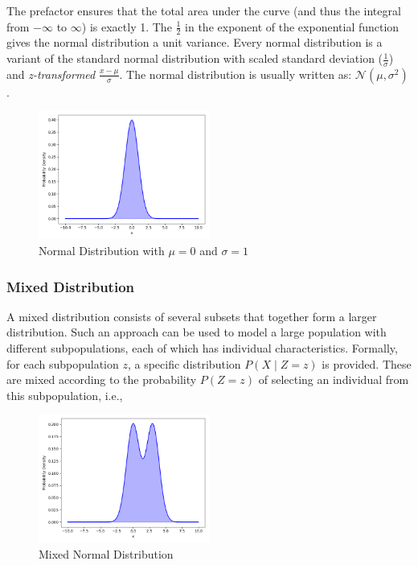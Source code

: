 The prefactor ensures that the total area under the curve (and thus the integral from $-\infty$ to $\infty$) is exactly 1. The $\frac{1}{2}$ in the exponent of the exponential function gives the normal distribution a unit variance. Every normal distribution is a variant of the standard normal distribution with scaled standard deviation ($\frac{1}{\sigma}$) and \textit{z-transformed} $\frac{x - \mu}{\sigma}$. The normal distribution is usually written as: $\mathcal{N}(\mu, \sigma^2)$.

\begin{figure}[h]
    \centering
    \includegraphics[width=0.5\textwidth]{../images/plot_normal_distribution.png}
    \caption{Normal Distribution with $\mu=0$ and $\sigma=1$}
    \label{fig:normal_distribution}
\end{figure}


\subsubsection{Mixed Distribution}\label{Mixed Distribution}
A mixed distribution consists of several subsets that together form a larger distribution. Such an approach can be used to model a large population with different subpopulations, each of which has individual characteristics. Formally, for each subpopulation $z$, a specific distribution $P(X\mid Z=z)$ is provided. These are mixed according to the probability $P(Z=z)$ of selecting an individual from this subpopulation, i.e.,

\begin{figure}[h]
    \centering
    \includegraphics[width=0.5\textwidth]{../images/plot_mixed_normal_distribution.png}
    \caption{Mixed Normal Distribution}
    \label{fig:mixed_normal_distribution}
\end{figure}

